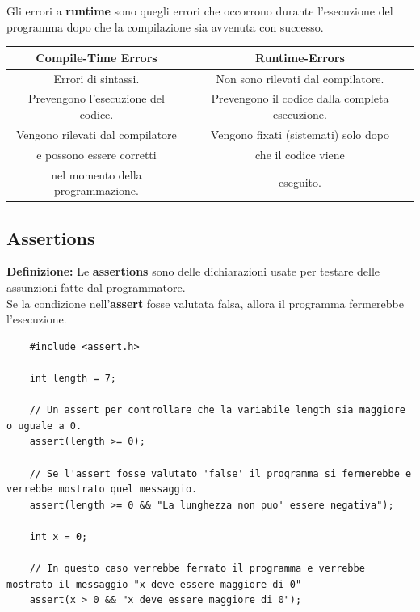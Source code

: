 \textsf{\small Gli errori a \textbf{runtime} sono quegli errori che occorrono durante l'esecuzione del programma dopo che la compilazione sia avvenuta con successo.} \break

\begin{tabular}{|c|c|}
	\hline
	\textbf{Compile-Time Errors} & \textbf{Runtime-Errors} \\
	\hline
	\textsf{\small Errori di sintassi.} & \textsf{\small Non sono rilevati dal compilatore.} \\
	\textsf{\small Prevengono l'esecuzione del codice.} & \textsf{\small Prevengono il codice dalla completa esecuzione.} \\
	\textsf{\small Vengono rilevati dal compilatore } & \textsf{\small Vengono fixati (sistemati) solo dopo} \\
	\textsf{\small e possono essere corretti} & \textsf{\small che il codice viene} \\
	\textsf{\small nel momento della programmazione.} & \textsf{\small eseguito.} \\
	\hline
\end{tabular}

\subsection{Assertions}

\textsf{\small \textbf{Definizione: } Le \textbf{assertions} sono delle dichiarazioni usate per testare delle assunzioni fatte dal programmatore.} \\

\textsf{\small Se la condizione nell'\textbf{assert} fosse valutata falsa, allora il programma fermerebbe l'esecuzione.} \\

\begin{lstlisting}
	#include <assert.h>
	
	int length = 7;
	
	// Un assert per controllare che la variabile length sia maggiore o uguale a 0.
	assert(length >= 0);
	
	// Se l'assert fosse valutato 'false' il programma si fermerebbe e verrebbe mostrato quel messaggio.
	assert(length >= 0 && "La lunghezza non puo' essere negativa");
	
	int x = 0;
	
	// In questo caso verrebbe fermato il programma e verrebbe mostrato il messaggio "x deve essere maggiore di 0"
	assert(x > 0 && "x deve essere maggiore di 0"); 
\end{lstlisting}

